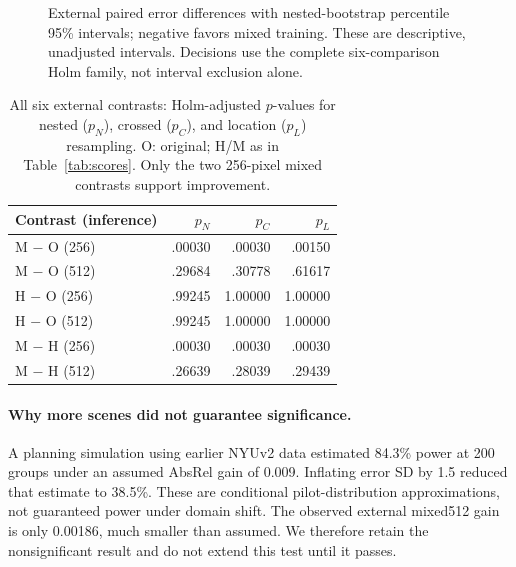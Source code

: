 \begin{figure}[t]
\centering
{}
\caption{External paired error differences with nested-bootstrap percentile 95\% intervals; negative favors mixed training. These are descriptive, unadjusted intervals. Decisions use the complete six-comparison Holm family, not interval exclusion alone.}
\label{fig:gain}
\end{figure}


\begin{table}[t]
\centering\small
\caption{All six external contrasts: Holm-adjusted $p$-values for nested ($p_N$), crossed ($p_C$), and location ($p_L$) resampling. O: original; H/M as in Table~\ref{tab:scores}. Only the two 256-pixel mixed contrasts support improvement.}
\label{tab:holm}
\begin{tabular}{lrrr}\toprule
Contrast (inference) & $p_N$ & $p_C$ & $p_L$\\\midrule
M $-$ O (256) & .00030 & .00030 & .00150\\
M $-$ O (512) & .29684 & .30778 & .61617\\
H $-$ O (256) & .99245 & 1.00000 & 1.00000\\
H $-$ O (512) & .99245 & 1.00000 & 1.00000\\
M $-$ H (256) & .00030 & .00030 & .00030\\
M $-$ H (512) & .26639 & .28039 & .29439\\\bottomrule
\end{tabular}
\end{table}

\paragraph{Why more scenes did not guarantee significance.}
A planning simulation using earlier NYUv2 data estimated 84.3\% power at 200 groups under an assumed AbsRel gain of 0.009. Inflating error SD by 1.5 reduced that estimate to 38.5\%. These are conditional pilot-distribution approximations, not guaranteed power under domain shift. The observed external mixed512 gain is only 0.00186, much smaller than assumed. We therefore retain the nonsignificant result and do not extend this test until it passes.

